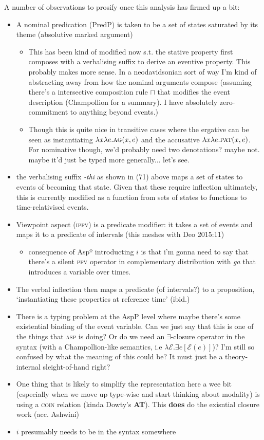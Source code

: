 A number of observations to prosify once this analysis has firmed up a bit:
\begin{itemize}
	\item A nominal predication (PredP) is taken to be a set of states saturated by its theme (absolutive marked argument)
	\begin{itemize}
		\item This has been kind of modified now s.t. the stative property first composes with a verbalising suffix to derive an eventive property.  This probably makes more sense. In a neodavidsonian sort of way I'm kind of abstracting away from how the nominal arguments compose (assuming there's a intersective composition rule $ \boldsymbol\sqcap $ that modifies the event description (Champollion for a summary). I have absolutely zero-commitment to anything beyond events.)
		\item Though this is quite nice in transitive cases where the ergative can be seen as instantiating $ \lambda x\lambda e.\textsc{ag}(x,e) $ and the accusative $ \lambda x\lambda e.\textsc{pat}(x,e) $. For nominative though, we'd probably need two denotations? maybe not. maybe it'd just be typed more generally... let's see.
	\end{itemize}
	\item the verbalising suffix \textit{-thi} as shown in (71) above maps a set of states to events of becoming that state. Given that these require inflection ultimately, this is currently modified as a function from sets of states to functions to time-relativised events.
	\item Viewpoint aspect (\textsc{ipfv}) is a predicate modifier: it takes a set of events and maps it to a predicate of intervals (this meshes with Deo 2015:11)
	\begin{itemize}
		\item consequence of Aspº introducting $ i $ is that i'm gonna need to say that there's a silent \textsc{pfv} operator in complementary distribution with \textit{ga} that introduces a variable over times.
	\end{itemize}
	\item The verbal inflection then maps a predicate (of intervals?) to a proposition, `instantiating these properties at reference time' (ibid.)
	\item {\color{orange}There is a typing problem at the AspP level where maybe there's some existential binding of the event variable. Can we just say that this is one of the things that \textsc{asp} is doing? Or do we need an $ \exists $-closure operator in the syntax (with a Champollion-like semantics, i.e $ \lambda\mathcal E.\exists e[\mathcal E(e)] $)?} I'm still so confused by what the meaning of this could be? It must just be a theory-internal sleight-of-hand right?
	\item {\color{forest} One thing that is likely to simplify the representation here a wee bit (especially when we move up type-wise and start thinking about modality) is using a \textsc{coin} relation (kinda Dowty's \textbf{AT}). This \textbf{does} do the exisntial closure work (acc. Ashwini)}
	\item $ i $  presumably needs to be in the syntax somewhere
\end{itemize}\fi

